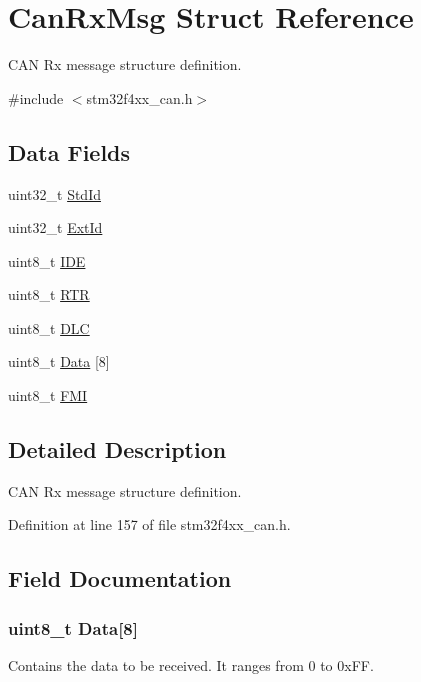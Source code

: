 \hypertarget{struct_can_rx_msg}{\section{Can\-Rx\-Msg Struct Reference}
\label{struct_can_rx_msg}
}


C\-A\-N Rx message structure definition.  




{\ttfamily \#include $<$stm32f4xx\-\_\-can.\-h$>$}

\subsection*{Data Fields}
\begin{DoxyCompactItemize}
\item 
uint32\-\_\-t \hyperlink{struct_can_rx_msg_a511131786af8d1534273e48ea2052245}{Std\-Id}
\item 
uint32\-\_\-t \hyperlink{struct_can_rx_msg_a8625d2aaf6b0b99f0faf0b8cd07debd4}{Ext\-Id}
\item 
uint8\-\_\-t \hyperlink{struct_can_rx_msg_accecf260a60cf687f0f9898421aeea86}{I\-D\-E}
\item 
uint8\-\_\-t \hyperlink{struct_can_rx_msg_a131e825d532b66f27dbb74aa80864d37}{R\-T\-R}
\item 
uint8\-\_\-t \hyperlink{struct_can_rx_msg_a5f86974a53a85fb5706e08f8106296b9}{D\-L\-C}
\item 
uint8\-\_\-t \hyperlink{struct_can_rx_msg_ab7783127a49388ba2431603e29251b9b}{Data} \mbox{[}8\mbox{]}
\item 
uint8\-\_\-t \hyperlink{struct_can_rx_msg_af219946419093720aad14ef427f3cde4}{F\-M\-I}
\end{DoxyCompactItemize}


\subsection{Detailed Description}
C\-A\-N Rx message structure definition. 

Definition at line 157 of file stm32f4xx\-\_\-can.\-h.



\subsection{Field Documentation}
\hypertarget{struct_can_rx_msg_ab7783127a49388ba2431603e29251b9b}{
\subsubsection[{Data}]{\setlength{\rightskip}{0pt plus 5cm}uint8\-\_\-t Data\mbox{[}8\mbox{]}}}\label{struct_can_rx_msg_ab7783127a49388ba2431603e29251b9b}
Contains the data to be received. It ranges from 0 to 0x\-F\-F. 


